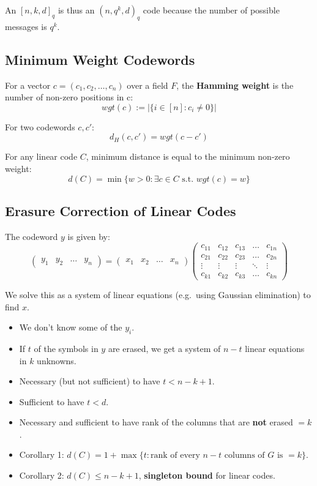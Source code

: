\documentclass[11pt]{article}
\begin{document}
An $[n, k, d]_q$ is thus an $(n, q^k, d)_q$ code because the number of possible messages is $q^k$.

\subsection{Minimum Weight Codewords}
For a vector $c = (c_1, c_2, \ldots, c_n)$ over a field $F$, the \textbf{Hamming weight} is the number of non-zero positions in c:
\[
  wgt(c) := \lvert \{ i \in [n] : c_i \neq 0 \} \rvert
\]

For two codewords $c, c'$:
\[
  d_H(c, c') = wgt(c - c')
\]

For any linear code $C$, minimum distance is equal to the minimum non-zero weight:
\[
  d(C) = \min \{ w > 0 : \exists c \in C \text{ s.t. } wgt(c) = w \}
\]

\subsection{Erasure Correction of Linear Codes}
The codeword $y$ is given by:
\[
  \begin{pmatrix}
    y_1 & y_2 & \dots & y_n
  \end{pmatrix}
  =
  \begin{pmatrix}
    x_1 & x_2 & \dots & x_n
  \end{pmatrix}
  \begin{pmatrix}
    c_{11} & c_{12} & c_{13} & \dots  & c_{1n} \\
    c_{21} & c_{22} & c_{23} & \dots  & c_{2n} \\
    \vdots & \vdots & \vdots & \ddots & \vdots \\
    c_{k1} & c_{k2} & c_{k3} & \dots  & c_{kn}
  \end{pmatrix}
\]

We solve this as a system of linear equations (e.g.\ using Gaussian elimination) to find $x$.
\begin{itemize}
  \item We don't know some of the $y_i$.
  \item If $t$ of the symbols in $y$ are erased, we get a system of $n - t$ linear equations in $k$ unknowns.
  \item Necessary (but not sufficient) to have $t < n - k + 1$.
  \item Sufficient to have $t < d$.
  \item Necessary and sufficient to have rank of the columns that are \textbf{not} erased $= k$.
  \item Corollary 1: $d(C) = 1 + \max \{ t : \text{rank of every } n - t \text{ columns of } G \text{ is } = k\}$.
  \item Corollary 2: $d(C) \leq n - k + 1$, \textbf{singleton bound} for linear codes.
\end{itemize}
\end{document}
